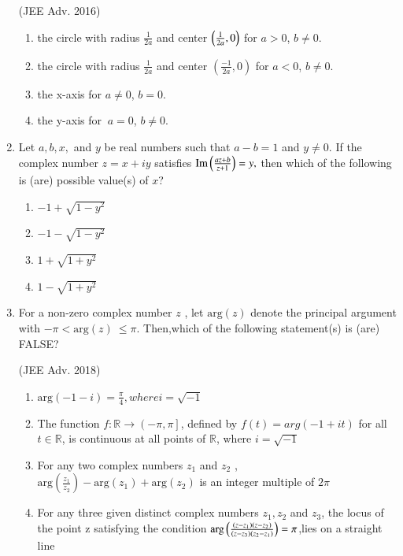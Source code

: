 \documentclass[journal,12pt,twocolumn]{IEEEtran}
\theoremstyle{remark}
\begin{document}
\begin{enumerate}
    \hfill (JEE Adv. 2016)

    \begin{enumerate}[label=\alph*.]
    \item the circle with radius $ \frac{1}{2a} $ and center $\left(\frac{1}{2a}, 0\right)$ for $ a > 0 $, $ b \ne 0 $.
    \item the circle with radius $ \frac{1}{2a} $ and center $\left(\frac{-1}{2a}, 0\right)$ for $ a < 0 $, $ b \ne 0 $.
    \item the x-axis for $ a \ne 0 $, $ b = 0 $.
    \item the y-axis for $\ a = 0 $, $ b \ne 0 $.
    \end{enumerate}

    \item Let $ a, b, x, $ and $ y $ be real numbers such that $ a - b = 1 $ and $ y \ne 0 $. If the complex number $ z = x + iy $ satisfies 
$
\text{Im}\left(\frac{az + b}{z + 1}\right) = y,
$
then which of the following is (are) possible value(s) of $ x $?

\begin{enumerate}[label=\alph*.]
    \item $ -1+\sqrt{1-y^2} $
    \item $ -1-\sqrt{1-y^2} $
    \item $ 1+\sqrt{1+y^2} $
    \item $ 1-\sqrt{1+y^2} $
    \end{enumerate}

    \item For a non-zero complex number $ z $ , let $ \text{arg}(z) $ denote the principal argument with $ -\pi < \text{arg}(z)\ \leq \pi $. Then,which of the following statement(s) is (are) FALSE? 
    
    \hfill (JEE Adv. 2018)

    \begin{enumerate}[label=\alph*.]
    \item $ \text{arg}(-1-i)= \frac{\pi}{4},where i= \sqrt{-1} $
    \item The function $ f: \mathbb{R} \to \left(-\pi, \pi\right] $, defined by $ f(t)=arg(-1+it) $ for all $ t \in \mathbb{R} $, is continuous at all points of $ \mathbb{R} $, where $ i= \sqrt{-1} $
    \item For any two complex numbers $ z_1 $ and $ z_2 $ , $ \text{arg}(\frac{z_1}{z_2})-\text{arg}(z_1)+\text{arg}(z_2) $ is an integer multiple of $ 2\pi $
    \item For any three given distinct complex numbers $ z_1,z_2 $ and $ z_3 $, the locus of the point z satisfying the condition $ \text{arg} \left(\frac{(z-z_1)(z-z_2)}{(z-z_3)(z_2-z_1)}\right) =\pi $,lies on a straight line
    \end{enumerate}


\end{enumerate}
\end{document}
